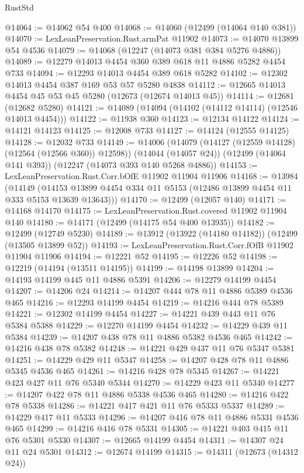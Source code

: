 \begin{lexlean}{RustStd}
\begin{coremodule}
@14064 := @14062 @54 @400
@14068 := @14060 (@12499 (@14064 @140 @381))
@14070 := LexLeanPreservation.Rust.armPat @11902
@14073 := @14070 @13899 @54 @4536
@14079 := @14068 (@12247 (@14073 @381 @384 @5276 @4886))
@14089 := @12279 @14013 @4454 @360 @389 @618 @11 @4886 @5282 @4454 @733
@14094 := @12293 @14013 @4454 @389 @618 @5282
@14102 := @12302 @14013 @4454 @387 @169 @53 @57 @5280 @4838
@14112 := @12665 @14013 @4454 @45 @53 @45 @5280 (@12673 (@12674 @14013 @45))
@14114 := @12681 (@12682 @5280)
@14121 := @14089 (@14094 (@14102 (@14112 @14114) (@12546 @14013 @4454)))
@14122 := @11938 @360
@14123 := @12134 @14122
@14124 := @14121 @14123
@14125 := @12008 @733
@14127 := @14124 (@12555 @14125)
@14128 := @12032 @733
@14149 := @14006
    (@14079 (@14127 (@12559 @14128) (@12564 (@12566 @360)) @12598))
    (@14044 (@14057 @24))
    (@12499 (@14064 @141 @393))
    (@12247 (@14073 @393 @140 @5268 @4886))
@14153 := LexLeanPreservation.Rust.Corr.bOfE @11902 @11904 @11906
@14168 := @13984
    (@14149 (@14153 @13899 @4454 @334 @11 @5153 (@12486 @13899 @4454 @11 @333 @5153 @13639 @13643)))
@14170 := @12499 (@12057 @140)
@14171 := @14168 @14170
@14175 := LexLeanPreservation.Rust.covered @11902 @11904 @140
@14180 := @14171 (@12499 (@14175 @54 @400 @13935))
@14182 := @12499 (@12749 @5230)
@14189 := @13912 (@13922 (@14180 @14182)) (@12499 (@13505 @13899 @52))
@14193 := LexLeanPreservation.Rust.Corr.fOfB @11902 @11904 @11906
@14194 := @12221 @52
@14195 := @12226 @52
@14198 := @12219 (@14194 (@13511 @14195))
@14199 := @14198 @13899
@14204 := @14193 @14199 @445 @11 @4886 @5391
@14206 := @12279 @14199 @4454
@14207 := @14206 @24
@14214 := @14207 @444 @78 @11 @4886 @5389 @4536 @465
@14216 := @12293 @14199 @4454
@14219 := @14216 @444 @78 @5389
@14221 := @12302 @14199 @4454
@14227 := @14221 @439 @443 @11 @76 @5384 @5388
@14229 := @12270 @14199 @4454
@14232 := @14229 @439 @11 @5384
@14239 := @14207 @438 @78 @11 @4886 @5382 @4536 @465
@14242 := @14216 @438 @78 @5382
@14248 := @14221 @429 @437 @11 @76 @5347 @5381
@14251 := @14229 @429 @11 @5347
@14258 := @14207 @428 @78 @11 @4886 @5345 @4536 @465
@14261 := @14216 @428 @78 @5345
@14267 := @14221 @423 @427 @11 @76 @5340 @5344
@14270 := @14229 @423 @11 @5340
@14277 := @14207 @422 @78 @11 @4886 @5338 @4536 @465
@14280 := @14216 @422 @78 @5338
@14286 := @14221 @417 @421 @11 @76 @5333 @5337
@14289 := @14229 @417 @11 @5333
@14296 := @14207 @416 @78 @11 @4886 @5331 @4536 @465
@14299 := @14216 @416 @78 @5331
@14305 := @14221 @403 @415 @11 @76 @5301 @5330
@14307 := @12665 @14199 @4454
@14311 := @14307 @24 @11 @24 @5301
@14312 := @12674 @14199
@14315 := @14311 (@12673 (@14312 @24))

\end{coremodule}
\end{lexlean}
